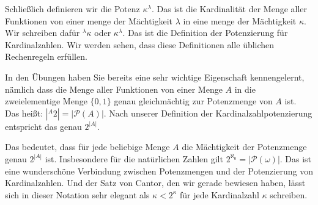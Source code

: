 \begin{spoken-clean}[01:14:20 - 01:16:39]
Schließlich definieren wir die Potenz $\kappa^\lambda$. Das ist die Kardinalität der Menge aller Funktionen von einer menge der Mächtigkeit $\lambda$ in eine menge der Mächtigkeit $\kappa$. Wir schreiben dafür ${}^\lambda \kappa$ oder $\kappa^\lambda$. Das ist die Definition der Potenzierung für Kardinalzahlen. Wir werden sehen, dass diese Definitionen alle üblichen Rechenregeln erfüllen.
\end{spoken-clean}

\begin{math-stroke}
\end{math-stroke}

\begin{spoken-clean}[01:16:39 - 01:18:55]
In den Übungen haben Sie bereits eine sehr wichtige Eigenschaft kennengelernt, nämlich dass die Menge aller Funktionen von einer Menge $A$ in die zweielementige Menge $\{0, 1\}$ genau gleichmächtig zur Potenzmenge von $A$ ist. Das heißt: $|{}^A 2| = |\mathcal{P}(A)|$. Nach unserer Definition der Kardinalzahlpotenzierung entspricht das genau $2^{|A|}$.

Das bedeutet, dass für jede beliebige Menge $A$ die Mächtigkeit der Potenzmenge genau $2^{|A|}$ ist. Insbesondere für die natürlichen Zahlen gilt $2^{\aleph_0} = |\mathcal{P}(\omega)|$. Das ist eine wunderschöne Verbindung zwischen Potenzmengen und der Potenzierung von Kardinalzahlen. Und der Satz von Cantor, den wir gerade bewiesen haben, lässt sich in dieser Notation sehr elegant als $\kappa < 2^\kappa$ für jede Kardinalzahl $\kappa$ schreiben.
\end{spoken-clean}


